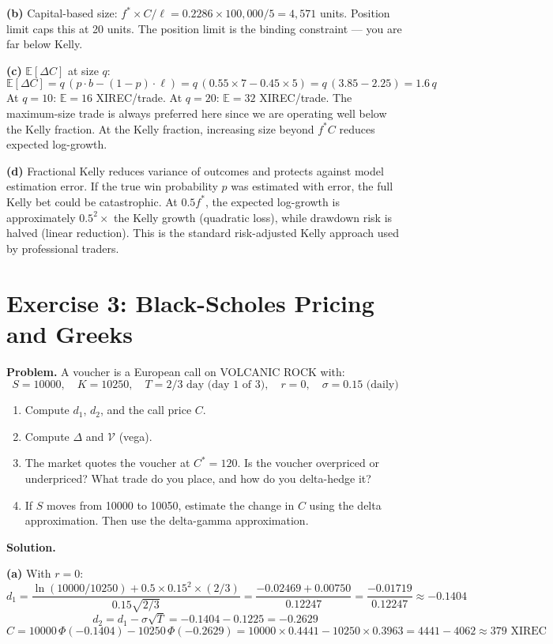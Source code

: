 \documentclass[12pt,a4paper,openany]{report}
\theoremstyle{definition}
\begin{document}
\textbf{(b)} Capital-based size: $f^* \times C / \ell = 0.2286 \times 100{,}000 / 5 = 4{,}571$ units. Position limit caps this at 20 units. The position limit is the binding constraint — you are far below Kelly.

\textbf{(c)} $\mathbb{E}[\Delta C]$ at size $q$:
\[
  \mathbb{E}[\Delta C] = q\,(p \cdot b - (1-p) \cdot \ell) = q\,(0.55 \times 7 - 0.45 \times 5) = q\,(3.85 - 2.25) = 1.6\,q
\]
At $q = 10$: $\mathbb{E} = 16$ XIREC/trade. At $q = 20$: $\mathbb{E} = 32$ XIREC/trade. The maximum-size trade is always preferred here since we are operating well below the Kelly fraction. At the Kelly fraction, increasing size beyond $f^* C$ reduces expected log-growth.

\textbf{(d)} Fractional Kelly reduces variance of outcomes and protects against model estimation error. If the true win probability $p$ was estimated with error, the full Kelly bet could be catastrophic. At $0.5f^*$, the expected log-growth is approximately $0.5^2 \times$ the Kelly growth (quadratic loss), while drawdown risk is halved (linear reduction). This is the standard risk-adjusted Kelly approach used by professional traders.

\section*{Exercise 3: Black-Scholes Pricing and Greeks}

\textbf{Problem.} A voucher is a European call on VOLCANIC ROCK with:
\[
  S = 10000, \quad K = 10250, \quad T = 2/3 \text{ day (day 1 of 3)}, \quad r = 0, \quad \sigma = 0.15 \text{ (daily)}
\]

\begin{enumerate}[label=(\alph*)]
  \item Compute $d_1$, $d_2$, and the call price $C$.
  \item Compute $\Delta$ and $\mathcal{V}$ (vega).
  \item The market quotes the voucher at $C^* = 120$. Is the voucher overpriced or underpriced? What trade do you place, and how do you delta-hedge it?
  \item If $S$ moves from 10000 to 10050, estimate the change in $C$ using the delta approximation. Then use the delta-gamma approximation.
\end{enumerate}

\textbf{Solution.}

\textbf{(a)} With $r = 0$:
\[
  d_1 = \frac{\ln(10000/10250) + 0.5 \times 0.15^2 \times (2/3)}{0.15\sqrt{2/3}} = \frac{-0.02469 + 0.00750}{0.12247} = \frac{-0.01719}{0.12247} \approx -0.1404
\]
\[
  d_2 = d_1 - \sigma\sqrt{T} = -0.1404 - 0.1225 = -0.2629
\]
\[
  C = 10000\,\Phi(-0.1404) - 10250\,\Phi(-0.2629) = 10000 \times 0.4441 - 10250 \times 0.3963 = 4441 - 4062 \approx 379 \text{ XIREC}
\]
\end{document}
